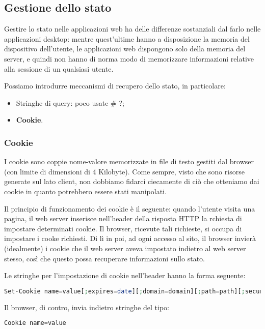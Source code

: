 \documentclass[a4paper,11pt]{article}
\begin{document}
\subsection{Gestione dello stato}
Gestire lo stato nelle applicazioni web ha delle differenze sostanziali dal farlo nelle applicazioni desktop: mentre quest'ultime hanno a disposizione la memoria del dispositivo dell'utente, le applicazioni web dispongono solo della memoria del server, e quindi non hanno di norma modo di memorizzare informazioni relative alla sessione di un qualsiasi utente.

Possiamo introdurre meccanismi di recupero dello stato, in particolare:
\begin{itemize}
	\item Stringhe di query: poco usate # ?;
	\item \textbf{Cookie}.
\end{itemize}

\subsubsection{Cookie}
I cookie sono coppie nome-valore memorizzate in file di testo gestiti dal browser (con limite di dimensioni di 4 Kilobyte).
Come sempre, visto che sono risorse generate sul lato client, non dobbiamo fidarci ciecamente di ciò che otteniamo dai cookie in quanto potrebbero essere stati manipolati.

Il principio di funzionamento dei cookie è il seguente: quando l'utente visita una pagina, il web server inserisce nell'header della risposta HTTP la rchiesta di impostare determinati cookie.
Il browser, ricevute tali richieste, si occupa di impostare i cooke richiesti.
Di lì in poi, ad ogni accesso al sito, il browser invierà (idealmente) i cookie che il web server aveva impostato indietro al web server stesso, così che questo possa recuperare informazioni sullo stato.

Le stringhe per l'impostazione di cookie nell'header hanno la forma seguente: 
\begin{lstlisting}[language=php, style=codestyle]	
Set-Cookie name=value[;expires=date][;domain=domain][;path=path][;secure]
\end{lstlisting}

Il browser, di contro, invia indietro stringhe del tipo:
\begin{lstlisting}[language=php, style=codestyle]	
Cookie name=value
\end{lstlisting}
\end{document}

